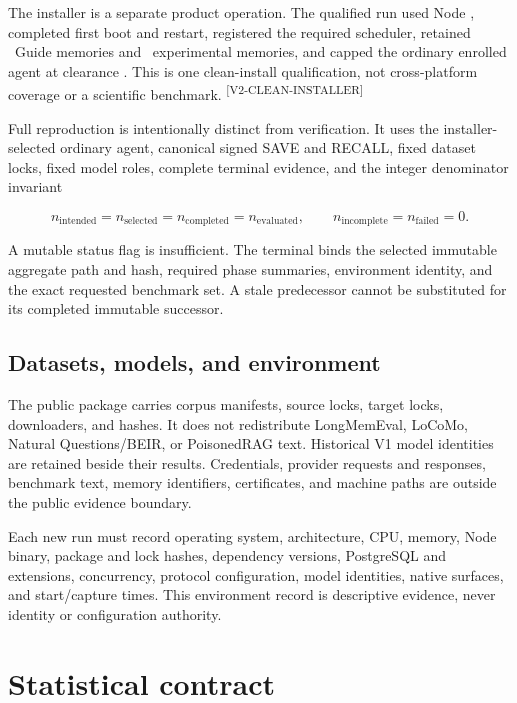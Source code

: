 \documentclass[10pt]{article}
\newcommand{\evidence}[1]{\textsuperscript{\scriptsize\textsf{[#1]}}}
\begin{document}
The installer is a separate product operation. The qualified run used Node
\MutMemInstallerNodeVersion, completed first boot and restart, registered the
required scheduler, retained \MutMemInstallerGuideCount\ Guide memories and
\MutMemInstallerExperimentalCount\ experimental memories, and capped the
ordinary enrolled agent at clearance \MutMemInstallerClearanceMaximum. This is
one clean-install qualification, not cross-platform coverage or a scientific
benchmark. \evidence{V2-CLEAN-INSTALLER}

Full reproduction is intentionally distinct from verification. It uses the
installer-selected ordinary agent, canonical signed SAVE and RECALL, fixed
dataset locks, fixed model roles, complete terminal evidence, and the integer
denominator invariant

\begin{equation}
n_{\mathrm{intended}}=n_{\mathrm{selected}}=n_{\mathrm{completed}}
=n_{\mathrm{evaluated}}, \qquad
n_{\mathrm{incomplete}}=n_{\mathrm{failed}}=0.
\label{eq:terminal-denominator}
\end{equation}

A mutable status flag is insufficient. The terminal binds the selected
immutable aggregate path and hash, required phase summaries, environment
identity, and the exact requested benchmark set. A stale predecessor cannot be
substituted for its completed immutable successor.

\subsection{Datasets, models, and environment}

The public package carries corpus manifests, source locks, target locks,
downloaders, and hashes. It does not redistribute LongMemEval, LoCoMo, Natural
Questions/BEIR, or PoisonedRAG text. Historical V1 model identities are retained
beside their results. Credentials, provider requests and responses, benchmark
text, memory identifiers, certificates, and machine paths are outside the
public evidence boundary.

Each new run must record operating system, architecture, CPU, memory, Node
binary, package and lock hashes, dependency versions, PostgreSQL and extensions,
concurrency, protocol configuration, model identities, native surfaces, and
start/capture times. This environment record is descriptive evidence, never
identity or configuration authority.

\section{Statistical contract}
\end{document}
